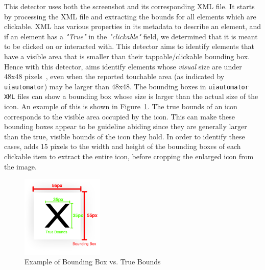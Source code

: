 This detector uses both the screenshot and its corresponding XML file. It starts by processing the XML file and extracting the bounds for all elements which are clickable. XML has various properties in its metadata to describe an element, and if an element has a \emph{"True"} in the \emph{"clickable"} field, we determined that it is meant to be clicked on  or interacted with. 
This detector aims to identify elements that have a visible area that is smaller than their tappable/clickable bounding box. Hence with this detector, \MotorEase aims identify elements whose \textit{visual} size are under 48x48 pixels~\cite{ANDRDesign}, even when the reported touchable area (as indicated by \texttt{\small uiautomator}) may be larger than 48x48. The bounding boxes in \texttt{\small uiautomator XML} files can show a bounding box whose size is larger than the actual size of the icon. 
An example of this is shown in Figure~\ref{boundBox}. The true bounds of an icon corresponds to the visible area occupied by the icon. This can make these bounding boxes appear to be guideline abiding since they are generally larger than the true, visible bounds of the icon they hold. 
In order to identify these cases, \MotorEase adds 15 pixels to the width and height of the bounding boxes of each clickable item to extract the entire icon, before cropping the enlarged icon from the image. %



\begin{figure}[t]
    \centering

    \includegraphics[width=0.35\textwidth]{imgs/boundBox.png}

    \caption{Example of Bounding Box vs. True Bounds}
    \label{boundBox}
\end{figure}

